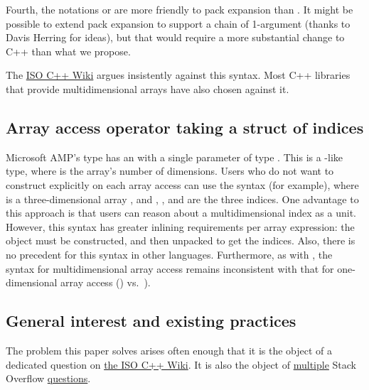 \documentclass{wg21}
\begin{document}
Fourth, the notations  or  are more friendly to pack expansion than .  It might be possible to extend pack expansion to support a chain of 1-argument  (thanks to Davis Herring for ideas), but that would require a more substantial change to C++ than what we propose.

The \href{https://isocpp.org/wiki/faq/operator-overloading#matrix-array-of-array}{ISO C++ Wiki} argues insistently against this syntax.  Most C++ libraries that provide multidimensional arrays have also chosen against it.

\subsection{Array access operator taking a struct of indices}

Microsoft AMP's  type has an  with a single parameter of type .  This is a -like type, where  is the array's number of dimensions.  Users who do not want to construct  explicitly on each array access can use the syntax  (for example), where  is a three-dimensional array , and , , and  are the three indices.  One advantage to this approach is that users can reason about a multidimensional index as a unit.  However, this syntax has greater inlining requirements per array expression: the  object must be constructed, and then unpacked to get the indices.  Also, there is no precedent for this  syntax in other languages.  Furthermore, as with , the syntax for multidimensional array access remains inconsistent with that for one-dimensional array access () vs.\ ).

\subsection{General interest and existing practices}

The problem this paper solves arises often enough that it is the object of a dedicated question on \href{https://isocpp.org/wiki/faq/operator-overloading#matrix-subscript-op}{the ISO C++ Wiki}.  It is also the object of \href{https://stackoverflow.com/questions/7032743/can-cs-operator-take-more-than-one-argument}{multiple} Stack Overflow \href{https://stackoverflow.com/questions/1936399/c-array-operator-with-multiple-arguments/1936410}{questions}.
\end{document}
